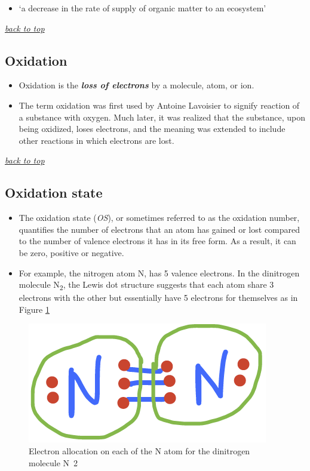 \documentclass[]{book}
\providecommand{\tightlist}{%
  \setlength{\itemsep}{0pt}\setlength{\parskip}{0pt}}
\theoremstyle{definition}
\theoremstyle{definition}
\theoremstyle{definition}
\theoremstyle{remark}
\begin{document}
\begin{itemize}
\tightlist
\item
  `a decrease in the rate of supply of organic matter to an ecosystem'
  \citep{Nixon2009-ft}
\end{itemize}

\emph{\protect\hyperlink{top}{back to top}}

\hypertarget{oxidation}{\subsection{Oxidation}\label{oxidation}}

\begin{itemize}
\tightlist
\item
  Oxidation is the \emph{\textbf{loss of electrons}} by a molecule,
  atom, or ion.
\item
  The term oxidation was first used by Antoine Lavoisier to signify
  reaction of a substance with oxygen. Much later, it was realized that
  the substance, upon being oxidized, loses electrons, and the meaning
  was extended to include other reactions in which electrons are lost.
\end{itemize}

\emph{\protect\hyperlink{top}{back to top}}

\hypertarget{oxidation-state}{\subsection{Oxidation
state}\label{oxidation-state}}

\begin{itemize}
\tightlist
\item
  The oxidation state (\emph{OS}), or sometimes referred to as the
  oxidation number, quantifies the number of electrons that an atom has
  gained or lost compared to the number of valence electrons it has in
  its free form. As a result, it can be zero, positive or negative.
\item
  For example, the nitrogen atom N, has 5 valence electrons. In the
  dinitrogen molecule N\textsubscript{2}, the Lewis dot structure
  suggests that each atom share 3 electrons with the other but
  essentially have 5 electrons for themselves as in Figure
  \ref{fig:ElecAlloc-N2}
\end{itemize}

\begin{figure}

{\centering \includegraphics[width=0.2\linewidth]{pictures/ElecAlloc_N2} 

}

\caption{Electron allocation on each of the N atom for the dinitrogen molecule N~2~}\label{fig:ElecAlloc-N2}
\end{figure}
\end{document}
